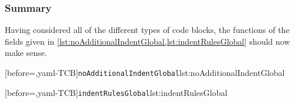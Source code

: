 \subsubsection{Summary}
 Having considered all of the different types of code blocks, the functions of the fields
 given in \cref{lst:noAdditionalIndentGlobal,lst:indentRulesGlobal} should now make sense.

 \begin{widepage}
  \begin{minipage}{.45\linewidth}
   [before=\centering,yaml-TCB]{\texttt{noAdditionalIndentGlobal}}{lst:noAdditionalIndentGlobal}
  \end{minipage}%
  \hfill
  \begin{minipage}{.49\linewidth}
   [before=\centering,yaml-TCB]{\texttt{indentRulesGlobal}}{lst:indentRulesGlobal}
  \end{minipage}%
 \end{widepage}
